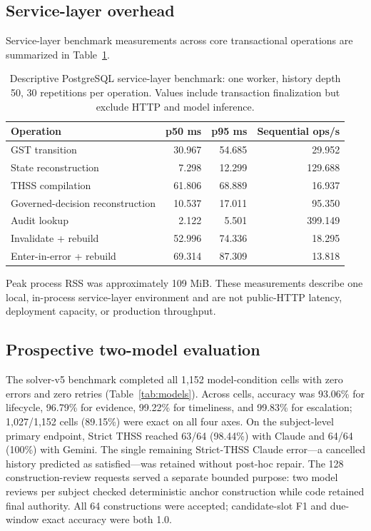 \documentclass[11pt]{article}
\begin{document}
\subsection{Service-layer overhead}
Service-layer benchmark measurements across core transactional operations are summarized in Table~\ref{tab:perf}.

\begin{table}[H]
\centering
\small
\caption{Descriptive PostgreSQL service-layer benchmark: one worker, history depth 50, 30 repetitions per operation. Values include transaction finalization but exclude HTTP and model inference.}
\label{tab:perf}
\begin{tabular}{lrrr}
\toprule
\textbf{Operation} & \textbf{p50 ms} & \textbf{p95 ms} & \textbf{Sequential ops/s}\\
\midrule
GST transition & 30.967 & 54.685 & 29.952\\
State reconstruction & 7.298 & 12.299 & 129.688\\
THSS compilation & 61.806 & 68.889 & 16.937\\
Governed-decision reconstruction & 10.537 & 17.011 & 95.350\\
Audit lookup & 2.122 & 5.501 & 399.149\\
Invalidate + rebuild & 52.996 & 74.336 & 18.295\\
Enter-in-error + rebuild & 69.314 & 87.309 & 13.818\\
\bottomrule
\end{tabular}
\end{table}
Peak process RSS was approximately 109 MiB. These measurements describe one local, in-process service-layer environment and are not public-HTTP latency, deployment capacity, or production throughput.

\subsection{Prospective two-model evaluation}
The solver-v5 benchmark completed all 1,152 model-condition cells with zero errors and zero retries (Table~\ref{tab:models}). Across cells, accuracy was 93.06\% for lifecycle, 96.79\% for evidence, 99.22\% for timeliness, and 99.83\% for escalation; 1,027/1,152 cells (89.15\%) were exact on all four axes. On the subject-level primary endpoint, Strict THSS reached 63/64 (98.44\%) with Claude and 64/64 (100\%) with Gemini. The single remaining Strict-THSS Claude error---a cancelled history predicted as satisfied---was retained without post-hoc repair. The 128 construction-review requests served a separate bounded purpose: two model reviews per subject checked deterministic anchor construction while code retained final authority. All 64 constructions were accepted; candidate-slot F1 and due-window exact accuracy were both 1.0.
\end{document}
